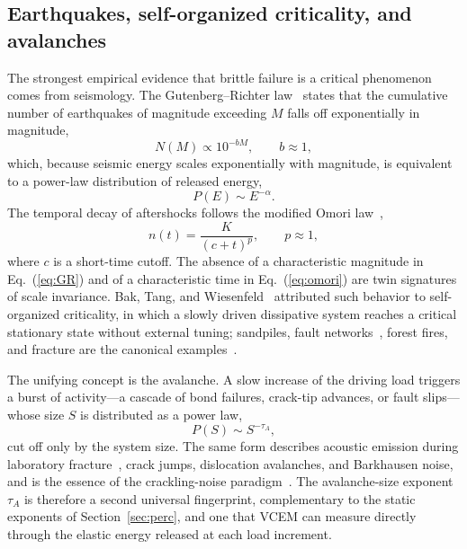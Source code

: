 \documentclass[preprint,12pt]{elsarticle}
\begin{document}
\subsection{Earthquakes, self-organized criticality, and avalanches}
\label{sec:earthquakes}

The strongest empirical evidence that brittle failure is a critical phenomenon comes
from seismology. The Gutenberg--Richter law~\cite{GutenbergRichter1944} states that
the cumulative number of earthquakes of magnitude exceeding $M$ falls off
exponentially in magnitude,
\begin{equation}
N(M) \propto 10^{-bM}, \qquad b \approx 1,
\label{eq:GR}
\end{equation}
which, because seismic energy scales exponentially with magnitude, is equivalent to a
power-law distribution of released energy,
\begin{equation}
P(E) \sim E^{-\alpha}.
\label{eq:GR-energy}
\end{equation}
The temporal decay of aftershocks follows the modified Omori
law~\cite{Omori1894,Utsu1961},
\begin{equation}
n(t) = \frac{K}{(c+t)^{p}}, \qquad p \approx 1,
\label{eq:omori}
\end{equation}
where $c$ is a short-time cutoff. The absence of a characteristic magnitude in
Eq.~(\ref{eq:GR}) and of a characteristic time in Eq.~(\ref{eq:omori}) are twin
signatures of scale invariance. Bak, Tang, and
Wiesenfeld~\cite{BakTangWiesenfeld1987} attributed such behavior to self-organized
criticality, in which a slowly driven dissipative system reaches a critical
stationary state without external tuning; sandpiles, fault
networks~\cite{BurridgeKnopoff1967,OlamiFederChristensen1992,CowieVannesteSornette1993},
forest fires, and fracture are the canonical examples~\cite{Turcotte1999,Sornette2006}.

The unifying concept is the avalanche. A slow increase of the driving load triggers a
burst of activity---a cascade of bond failures, crack-tip advances, or fault slips---
whose size $S$ is distributed as a power law,
\begin{equation}
P(S) \sim S^{-\tau_A},
\label{eq:avalanche}
\end{equation}
cut off only by the system size. The same form describes acoustic emission during
laboratory fracture~\cite{GarcimartinGuarinoBellonCiliberto1997}, crack jumps,
dislocation avalanches, and Barkhausen noise, and is the essence of the
crackling-noise paradigm~\cite{SethnaDahmenMyers2001}. The avalanche-size exponent
$\tau_A$ is therefore a second universal fingerprint, complementary to the static
exponents of Section~\ref{sec:perc}, and one that VCEM can measure directly through
the elastic energy released at each load increment.
\end{document}
